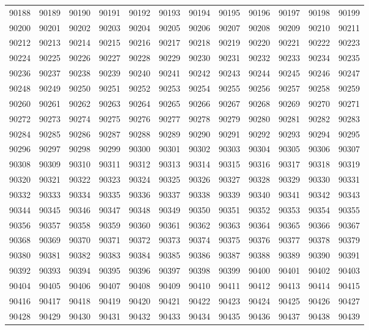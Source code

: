 \begin{center}
\begin{longtable}{llllllllllll}
90188 &90189 &90190 &90191 &90192 &90193 &90194 &90195 &90196 &90197 &90198 &90199 \\
90200 &90201 &90202 &90203 &90204 &90205 &90206 &90207 &90208 &90209 &90210 &90211 \\
90212 &90213 &90214 &90215 &90216 &90217 &90218 &90219 &90220 &90221 &90222 &90223 \\
90224 &90225 &90226 &90227 &90228 &90229 &90230 &90231 &90232 &90233 &90234 &90235 \\
90236 &90237 &90238 &90239 &90240 &90241 &90242 &90243 &90244 &90245 &90246 &90247 \\
90248 &90249 &90250 &90251 &90252 &90253 &90254 &90255 &90256 &90257 &90258 &90259 \\
90260 &90261 &90262 &90263 &90264 &90265 &90266 &90267 &90268 &90269 &90270 &90271 \\
90272 &90273 &90274 &90275 &90276 &90277 &90278 &90279 &90280 &90281 &90282 &90283 \\
90284 &90285 &90286 &90287 &90288 &90289 &90290 &90291 &90292 &90293 &90294 &90295 \\
90296 &90297 &90298 &90299 &90300 &90301 &90302 &90303 &90304 &90305 &90306 &90307 \\
90308 &90309 &90310 &90311 &90312 &90313 &90314 &90315 &90316 &90317 &90318 &90319 \\
90320 &90321 &90322 &90323 &90324 &90325 &90326 &90327 &90328 &90329 &90330 &90331 \\
90332 &90333 &90334 &90335 &90336 &90337 &90338 &90339 &90340 &90341 &90342 &90343 \\
90344 &90345 &90346 &90347 &90348 &90349 &90350 &90351 &90352 &90353 &90354 &90355 \\
90356 &90357 &90358 &90359 &90360 &90361 &90362 &90363 &90364 &90365 &90366 &90367 \\
90368 &90369 &90370 &90371 &90372 &90373 &90374 &90375 &90376 &90377 &90378 &90379 \\
90380 &90381 &90382 &90383 &90384 &90385 &90386 &90387 &90388 &90389 &90390 &90391 \\
90392 &90393 &90394 &90395 &90396 &90397 &90398 &90399 &90400 &90401 &90402 &90403 \\
90404 &90405 &90406 &90407 &90408 &90409 &90410 &90411 &90412 &90413 &90414 &90415 \\
90416 &90417 &90418 &90419 &90420 &90421 &90422 &90423 &90424 &90425 &90426 &90427 \\
90428 &90429 &90430 &90431 &90432 &90433 &90434 &90435 &90436 &90437 &90438 &90439 \\

\end{longtable}
\end{center}
